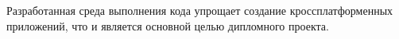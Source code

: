 
Разработанная среда выполнения кода упрощает создание кроссплатформенных приложений, что и является основной целью дипломного проекта.
